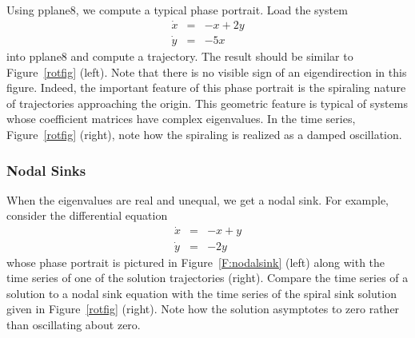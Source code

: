 \documentclass{ximera}
\begin{document}
Using {\sf pplane8}, we compute a typical
phase portrait.  Load the system
\begin{equation} \label{e:complex2}
\begin{array}{rcl}
\dot{x} & = & -x + 2y \\
\dot{y} & = & -5x
\end{array}
\end{equation}
into {\sf pplane8} and compute a trajectory.  The result should
be similar to Figure~\ref{rotfig} (left).  Note that there is no
visible sign of an eigendirection in this figure.
Indeed, the important feature of this phase portrait is the spiraling
nature of trajectories approaching the origin.  This geometric feature
is typical of systems whose coefficient matrices have complex
eigenvalues.  In the time series, Figure~\ref{rotfig} (right),
note how the spiraling is realized as a damped oscillation.

\begin{figure*}[htb]
        \centerline{%
        }
        \caption{(Left) Phase plane for \protect\eqref{e:complex2}
              for $x,y\in [-5,5]$.  (Right) Time series $y$ versus $t$
	      of solution}
        \label{rotfig}
\end{figure*}




\subsubsection*{Nodal Sinks}

When the eigenvalues are real and unequal, we get a nodal sink.
For example, consider the differential equation
\begin{eqnarray*}
\dot{x} & = & -x+y \\
\dot{y} & = & -2y
\end{eqnarray*}
whose phase portrait is pictured
in Figure~\ref{F:nodalsink} (left)
along with the time series of one of the solution trajectories (right).
Compare the time series of a solution to a nodal sink equation
with the time series of the spiral sink solution given in
Figure~\ref{rotfig} (right).  Note how the solution asymptotes
to zero rather than oscillating about zero.

\begin{figure*}[htb]
           \centerline{%
           }
           \caption{(Left) Phase plane of nodal sink.
	(Right) Time series of a typical trajectory.}
           \label{F:nodalsink}
\end{figure*}
\end{document}
